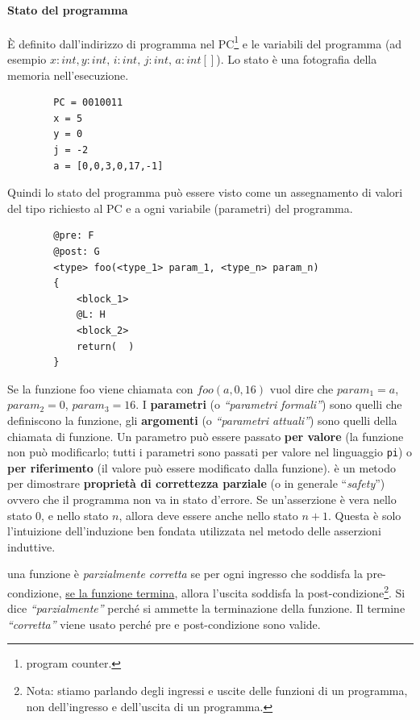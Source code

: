 \begin{enumerate}
	\paragraph{Stato del programma} È definito dall'indirizzo di programma nel PC\footnote{program counter.} e le variabili del programma (ad esempio $x:int,y:int,\, i:int,\, j:int,\, a:int[]$). Lo stato è una fotografia della memoria nell'esecuzione. 
	\begin{lstlisting}
		PC = 0010011
		x = 5
		y = 0
		j = -2 
		a = [0,0,3,0,17,-1]
	\end{lstlisting}
	Quindi lo stato del programma può essere visto come un assegnamento di valori del tipo richiesto al PC e a ogni variabile (parametri) del programma.
	
	\begin{lstlisting}
		@pre: F
		@post: G
		<type> foo(<type_1> param_1, <type_n> param_n)
		{
			<block_1>
			@L: H
			<block_2>
			return(  )  
		}
	\end{lstlisting}
	Se la funzione foo viene chiamata con $ \textit{foo}(a,0,16)$ vuol dire che $param_1 = a$, $param_2 = 0$, $param_3 = 16$.  I \textbf{parametri} (o \textit{``parametri formali''}) sono quelli che definiscono la funzione, gli \textbf{argomenti} (o \textit{``parametri attuali''}) sono quelli della chiamata di funzione. Un parametro può essere passato \textbf{per valore} (la funzione non può modificarlo; tutti i parametri sono passati per valore nel linguaggio \texttt{pi}) o \textbf{per riferimento} (il valore può essere modificato dalla funzione).
	 è un metodo per dimostrare \textbf{proprietà di correttezza parziale} (o in generale ``\textit{safety}'') ovvero che il programma non va in stato d'errore. Se un'asserzione è vera nello stato $0$, e nello stato $n$, allora deve essere anche nello stato $n+1$. Questa è solo l'intuizione dell'induzione ben fondata utilizzata nel metodo delle asserzioni induttive. 
	\begin{itemize}
		
		una funzione è \textit{parzialmente corretta} se per ogni ingresso che soddisfa la pre-condizione, \ul{se la funzione termina}, allora l'uscita soddisfa la post-condizione\footnote{Nota: stiamo parlando degli ingressi e uscite delle funzioni di un programma, non dell'ingresso e dell'uscita di un programma.}. Si dice \textit{``parzialmente''} perché si ammette la terminazione della funzione. Il termine \textit{``corretta''} viene usato perché pre e post-condizione sono valide. 
		

\end{itemize}
\end{enumerate}
